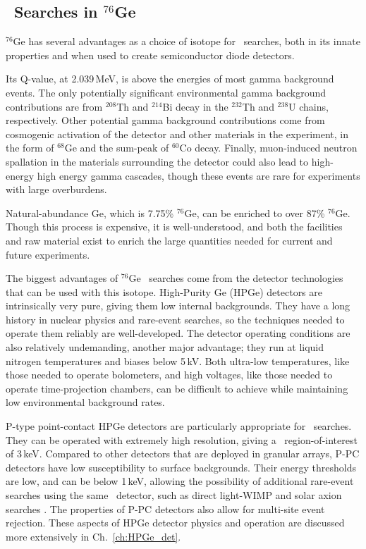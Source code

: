 \subsection{\nonubb\ Searches in $^{76}$Ge}
$^{76}$Ge has several advantages as a choice of isotope for \nonubb\ searches, both in its innate properties and when used to create semiconductor diode detectors. 

Its Q-value, at 2.039\,MeV, is above the energies of most gamma background events. The only potentially significant environmental gamma background contributions are from $^{208}$Th and $^{214}$Bi decay in the $^{232}$Th and $^{238}$U chains, respectively. Other potential gamma background contributions come from cosmogenic activation of the detector and other materials in the experiment, in the form of $^{68}$Ge and the sum-peak of $^{60}$Co decay. Finally, muon-induced neutron spallation in the materials surrounding the detector could also lead to high-energy high energy gamma cascades, though these events are rare for experiments with large overburdens.

Natural-abundance Ge, which is 7.75\% $^{76}$Ge, can be enriched to over 87\% $^{76}$Ge. Though this process is expensive, it is well-understood, and both the facilities and raw material exist to enrich the large quantities needed for current and future experiments. 

The biggest advantages of  $^{76}$Ge \nonubb\ searches come from the detector technologies that can be used with this isotope. High-Purity Ge (HPGe) detectors are intrinsically very pure, giving them low internal backgrounds. They have a long history in nuclear physics and rare-event searches, so the techniques needed to operate them reliably are well-developed. The detector operating conditions are also relatively undemanding, another major advantage; they run at liquid nitrogen temperatures and biases below 5\,kV. Both ultra-low temperatures, like those needed to operate bolometers, and high voltages, like those needed to operate time-projection chambers, can be difficult to achieve while maintaining low environmental background rates. 

P-type point-contact HPGe detectors are particularly appropriate for \nonubb\ searches. They can be operated with extremely high resolution, giving a \nonubb\ region-of-interest of 3\,keV. Compared to other detectors that are deployed in granular arrays, P-PC detectors have low susceptibility to surface backgrounds. Their energy thresholds are low, and can be below 1\,keV, allowing the possibility of additional rare-event searches using the same \nonubb\ detector, such as direct light-WIMP and solar axion searches \cite{MJD_WIMP2017}. The properties of P-PC detectors also allow for multi-site event rejection. These aspects of HPGe detector physics and operation are discussed more extensively in Ch.~\ref{ch:HPGe_det}. 

